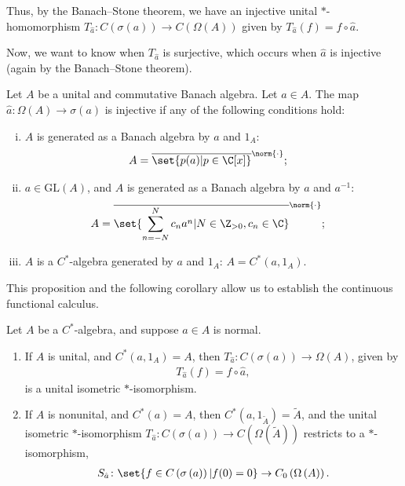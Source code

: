 Thus, by the Banach--Stone theorem, we have an injective unital $\ast$-homomorphism $T_{\hat{a}}\colon C\left(\sigma(a)\right) \rightarrow C\left( \Omega\left( A \right) \right)$ given by $T_{\hat{a}}(f) = f\circ \hat{a}$.\newline

Now, we want to know when $T_{\hat{a}}$ is surjective, which occurs when $\hat{a}$ is injective (again by the Banach--Stone theorem).
\begin{proposition}
  Let $A$ be a unital and commutative Banach algebra. Let $a\in A$. The map $\hat{a}\colon \Omega(A)\rightarrow \sigma(a)$ is injective if any of the following conditions hold:
  \begin{enumerate}[(i)]
    \item $A$ is generated as a Banach algebra by $a$ and $1_A$:
      \begin{align*}
        A &= \overline{\set{p(a) | p\in \C[x]}}^{\norm{\cdot}};
      \end{align*}
    \item $a\in \text{GL}(A)$, and $A$ is generated as a Banach algebra by $a$ and $a^{-1}$:
      \begin{align*}
        A &= \overline{\set{\sum_{n=-N}^{N}c_na^n | N\in\N,c_n\in\C}}^{\norm{\cdot}};
      \end{align*}
    \item $A$ is a $C^{\ast}$-algebra generated by $a$ and $1_A$: $A = C^{\ast}\left( a,1_A \right)$.
  \end{enumerate}
\end{proposition}
This proposition and the following corollary allow us to establish the continuous functional calculus.
\begin{corollary}
  Let $A$ be a $C^{\ast}$-algebra, and suppose $a\in A$ is normal.
  \begin{enumerate}[(1)]
    \item If $A$ is unital, and $C^{\ast}\left( a,1_A \right) = A$, then $T_{\hat{a}}\colon C\left( \sigma\left( a \right) \right)\rightarrow \Omega\left( A \right)$, given by 
      \begin{align*}
        T_{\hat{a}}(f) = f\circ\hat{a},
      \end{align*}
      is a unital isometric $\ast$-isomorphism.
    \item If $A$ is nonunital, and $C^{\ast}\left( a \right) = A$, then $C^{\ast}\left( a,1_{\widetilde{A}} \right) = \widetilde{A}$, and the unital isometric $\ast$-isomorphism $T_{\hat{a}}\colon C\left( \sigma\left( a \right) \right) \rightarrow C\left( \Omega\left( \widetilde{A} \right) \right)$ restricts to a $\ast$-isomorphism,
      \begin{align*}
        S_{\hat{a}}\colon \set{f\in C\left( \sigma\left( a \right) \right) | f(0) = 0} \rightarrow C_0\left( \Omega\left( A \right) \right).
      \end{align*}
  \end{enumerate}
\end{corollary}
